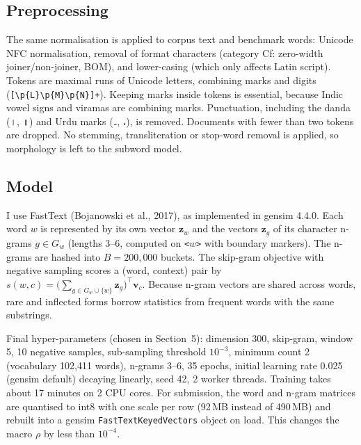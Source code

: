 \documentclass[11pt,a4paper]{article}
\begin{document}
\subsection{Preprocessing}
The same normalisation is applied to corpus text and benchmark words: Unicode NFC normalisation, removal of format characters (category Cf: zero-width joiner/non-joiner, BOM), and lower-casing (which only affects Latin script). Tokens are maximal runs of Unicode letters, combining marks and digits (\verb|[\p{L}\p{M}\p{N}]+|). Keeping marks inside tokens is essential, because Indic vowel signs and viramas are combining marks. Punctuation, including the danda ({\dev ।}, {\dev ॥}) and Urdu marks ({\urd ۔}, {\urd ،}), is removed. Documents with fewer than two tokens are dropped. No stemming, transliteration or stop-word removal is applied, so morphology is left to the subword model.

\subsection{Model}
I use FastText (Bojanowski et al., 2017), as implemented in gensim 4.4.0. Each word $w$ is represented by its own vector $\mathbf{z}_w$ and the vectors $\mathbf{z}_g$ of its character n-grams $g \in G_w$ (lengths 3--6, computed on \texttt{<}$w$\texttt{>} with boundary markers). The n-grams are hashed into $B=200{,}000$ buckets. The skip-gram objective with negative sampling scores a (word, context) pair by $s(w,c)=\big(\sum_{g\in G_w\cup\{w\}}\mathbf{z}_g\big)^\top \mathbf{v}_c$. Because n-gram vectors are shared across words, rare and inflected forms borrow statistics from frequent words with the same substrings.

Final hyper-parameters (chosen in Section~5): dimension 300, skip-gram, window 5, 10 negative samples, sub-sampling threshold $10^{-3}$, minimum count 2 (vocabulary 102{,}411 words), n-grams 3--6, 35 epochs, initial learning rate 0.025 (gensim default) decaying linearly, seed 42, 2 worker threads. Training takes about 17 minutes on 2 CPU cores. For submission, the word and n-gram matrices are quantised to int8 with one scale per row (92\,MB instead of 490\,MB) and rebuilt into a gensim \texttt{FastTextKeyedVectors} object on load. This changes the macro $\rho$ by less than $10^{-4}$.
\end{document}
